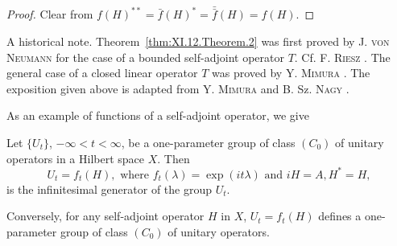 \begin{proof}
 Clear from $f(H)^{**} = \bar{f}(H)^* = \bar{\bar{f}}(H) = f(H)$. 
\end{proof}

A historical note. Theorem~\ref{thm:XI.12.Theorem.2} was first proved by J. \textsc{von} \textsc{Neumann} \cite{neumann234} for the case of a bounded self-adjoint operator $T$. Cf. F. \textsc{Riesz} \cite{rickart276}. The general case of a closed linear operator $T$ was proved by Y. \textsc{Mimura} \cite{mimura201}. The exposition given above is adapted from Y. \textsc{Mimura} \cite{mimura201} and B. Sz. \textsc{Nagy} \cite{nagy217}. 


\label{sec:XI.13}

As an example of functions of a self-adjoint operator, we give 

\begin{theorem}\label{thm:XI.13.Theorem.1} Let $\{U_t\}$, $-\infty < t < \infty$, be a one-parameter group of class $(C_0)$ of unitary operators in a Hilbert space $X$. Then 
\begin{equation}\label{eq:XI.13.1}
U _{t} = f _{t} (H), \text{ where } f _{t} (\lambda) = \exp (i t \lambda) \text{ and } i H = A, H ^{*} = H,
\end{equation}
is the infinitesimal generator of the group $U_{t}$. 
\end{theorem}


Conversely, for any self-adjoint operator $H$ in $X$, $U_{t} = f_{t}(H)$ defines a one-parameter group of class $(C_0)$ of unitary operators. 

